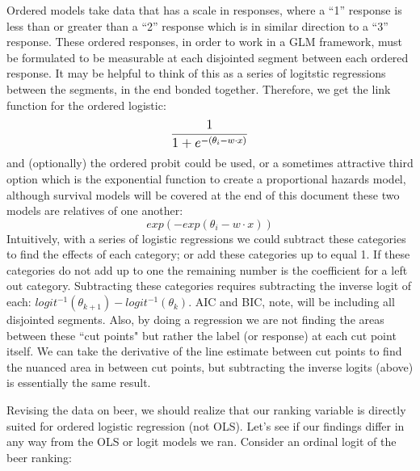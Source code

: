 \documentclass[12pt]{article}\usepackage[]{graphicx}\usepackage[]{color}
\begin{document}
\begin{flushleft}
Ordered models take data that has a scale in responses, where a ``1'' response is less than or greater than a ``2'' response which is in similar direction to a ``3'' response. These ordered responses, in order to work in a GLM framework, must be formulated to be measurable at each disjointed segment between each ordered response. It may be helpful to think of this as a series of logitstic regressions between the segments, in the end bonded together. Therefore, we get the link function for the ordered logistic:\\ 
\begin{equation}
\mathlarger{ \frac{1}{1+ e^{-(\theta_i- w\cdot x)}   }  }
\end{equation}
\noindent and (optionally) the ordered probit could be used, or a sometimes attractive third option which is the exponential function to create a proportional hazards model, although survival models will be covered at the end of this document these two models are relatives of one another:\\
\begin{equation}
exp(-exp(\theta_i - w \cdot x))
\end{equation}
Intuitively, with a series of logistic regressions we could subtract these categories to find the effects of each category; or add these categories up to equal 1. If these categories do not add up to one the remaining number is the coefficient for a left out category. Subtracting these categories requires subtracting the inverse logit of each: $logit^{-1}(\theta_{k+1}) - logit^{-1} (\theta_k)$. AIC and BIC, note, will be including all disjointed segments. Also, by doing a regression we are not finding the areas between these ``cut points" but rather the label (or response) at each cut point itself. We can take the derivative of the line estimate between cut points to find the nuanced area in between cut points, but subtracting the inverse logits (above) is essentially the same result.

Revising the data on beer, we should realize that our ranking variable is directly suited for ordered logistic regression (not OLS). Let's see if our findings differ in any way from the OLS or logit models we ran. Consider an ordinal logit of the beer ranking:




\end{flushleft}
\end{document}
